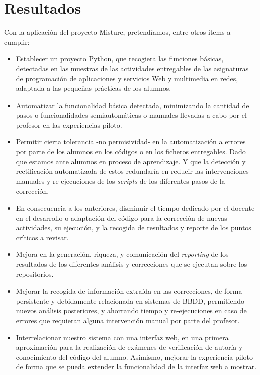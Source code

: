 \cleardoublepage
\chapter{Resultados}
\label{chap:resultados}

Con la aplicación del proyecto Misture, pretendíamos, entre otros items a cumplir:\\


\begin{itemize}
\item Establecer un proyecto Python, que recogiera las funciones básicas, detectadas en las muestras de las actividades entregables de las asignaturas de programación de aplicaciones y servicios Web y multimedia en redes, adaptada a las pequeñas prácticas de los alumnos.

\item Automatizar la funcionalidad básica detectada, minimizando la cantidad de pasos o funcionalidades semiautomáticas o manuales llevadas a cabo por el profesor en las experiencias piloto.

\item Permitir cierta tolerancia -no permisividad- en la automatización a errores por parte de los alumnos en los códigos o en los ficheros entregables. Dado que estamos ante alumnos en proceso de aprendizaje. Y que la detección y rectificación automatizada de estos redundaría en reducir las intervenciones manuales y re-ejecuciones de los \textit{scripts} de los diferentes pasos de la corrección.

\item En consecuencia a los anteriores, disminuir el tiempo dedicado por el docente en el desarrollo o adaptación del código para la corrección de nuevas actividades, su ejecución, y la recogida de resultados y reporte de los puntos críticos a revisar.

\item Mejora en la generación, riqueza, y comunicación del \textit{reporting} de los resultados de los diferentes análisis y correcciones que se ejecutan sobre los repositorios.

\item Mejorar la recogida de información extraída en las correcciones, de forma persistente y debidamente relacionada en sistemas de BBDD, permitiendo nuevos análisis posteriores, y ahorrando tiempo y re-ejecuciones en caso de errores que requieran alguna intervención manual por parte del profesor.

\item Interrelacionar nuestro sistema con una interfaz web, en una primera aproximación para la realización de exámenes de verificación de autoría y conocimiento del código del alumno. Asimismo, mejorar la experiencia piloto de forma que se pueda extender la funcionalidad de la interfaz web a mostrar.
\end{itemize}

